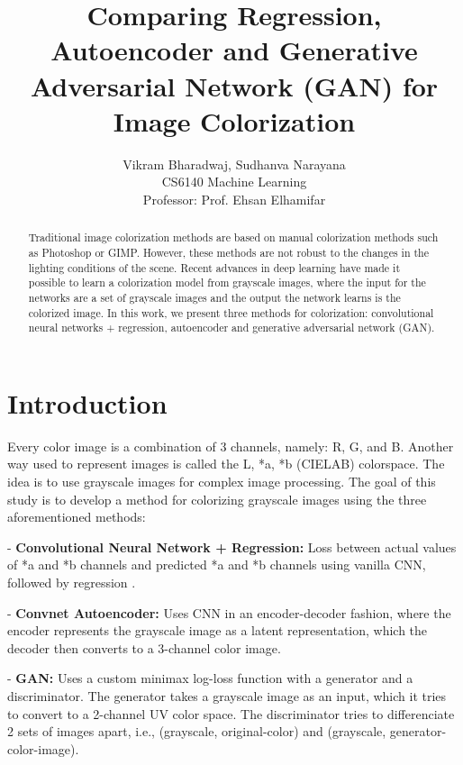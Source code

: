 \documentclass{article}
\title{Comparing Regression, Autoencoder and Generative
Adversarial Network (GAN) for Image Colorization}
\author{Vikram Bharadwaj, Sudhanva Narayana \\ 
        CS6140 Machine Learning \\
        Professor: Prof. Ehsan Elhamifar \\}
\begin{document}
\maketitle

\begin{abstract}
Traditional image colorization methods are based on manual colorization methods such as Photoshop or GIMP.
However, these methods are not robust to the changes in the lighting conditions of the scene.
Recent advances in deep learning have made it possible to learn a colorization model from grayscale images, where the input for the networks are a set of grayscale images and the output the network learns is the colorized image. 
In this work, we present three methods for colorization: convolutional neural networks + regression, autoencoder and generative adversarial network (GAN).
\end{abstract}

\section{Introduction}
Every color image is a combination of 3 channels, namely: R, G, and B. 
Another way used to represent images is called the L, *a, *b (CIELAB) colorspace.
The idea is to use grayscale images for complex image processing. 
The goal of this study is to develop a method for colorizing grayscale images using the three aforementioned methods:

- \textbf{Convolutional Neural Network + Regression:} Loss between actual values of *a and *b channels and predicted *a and *b channels using vanilla CNN, followed by regression \cite{1}.

- \textbf{Convnet Autoencoder:} Uses CNN in an encoder-decoder fashion, where the encoder represents the grayscale image as a latent representation, which the decoder then converts to a 3-channel color image.

- \textbf{GAN:}  Uses a custom minimax log-loss function with a generator and a discriminator. The generator takes a grayscale image as an input, which it tries to convert to a 2-channel UV color space. The discriminator tries to differenciate 2 sets of images apart, i.e., (grayscale, original-color) and (grayscale, generator-color-image).

\end{document}
